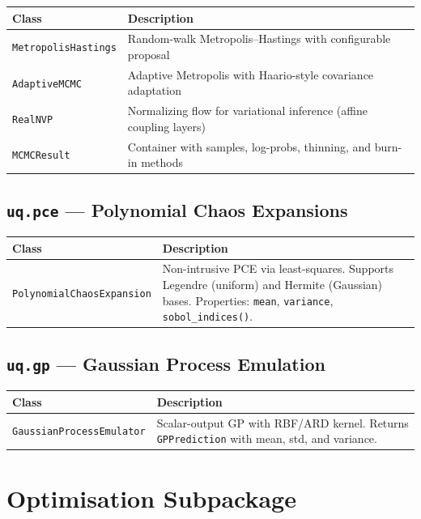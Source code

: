 \documentclass[11pt,a4paper]{report}
\begin{document}
\begin{longtable}{lp{8cm}}
\toprule
\textbf{Class} & \textbf{Description} \\
\midrule
\texttt{MetropolisHastings} & Random-walk Metropolis--Hastings with configurable proposal \\
\texttt{AdaptiveMCMC} & Adaptive Metropolis with Haario-style covariance adaptation \\
\texttt{RealNVP} & Normalizing flow for variational inference (affine coupling layers) \\
\texttt{MCMCResult} & Container with samples, log-probs, thinning, and burn-in methods \\
\bottomrule
\end{longtable}

\section{\texttt{uq.pce} --- Polynomial Chaos Expansions}

\begin{longtable}{lp{8cm}}
\toprule
\textbf{Class} & \textbf{Description} \\
\midrule
\texttt{PolynomialChaosExpansion} & Non-intrusive PCE via least-squares. Supports Legendre (uniform) and Hermite (Gaussian) bases. Properties: \texttt{mean}, \texttt{variance}, \texttt{sobol\_indices()}. \\
\bottomrule
\end{longtable}

\section{\texttt{uq.gp} --- Gaussian Process Emulation}

\begin{longtable}{lp{8cm}}
\toprule
\textbf{Class} & \textbf{Description} \\
\midrule
\texttt{GaussianProcessEmulator} & Scalar-output GP with RBF/ARD kernel. Returns \texttt{GPPrediction} with mean, std, and variance. \\
\bottomrule
\end{longtable}

\chapter{Optimisation Subpackage}
\end{document}
